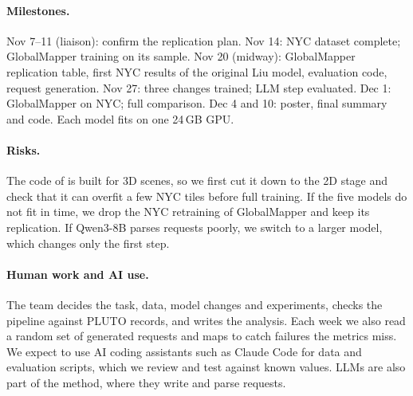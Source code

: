 \documentclass[twocolumn,11pt]{article}
\begin{document}
\paragraph{Milestones.} Nov 7--11 (liaison): confirm the replication plan. Nov 14: NYC dataset complete; GlobalMapper training on its sample. Nov 20 (midway): GlobalMapper replication table, first NYC results of the original Liu model, evaluation code, request generation. Nov 27: three changes trained; LLM step evaluated. Dec 1: GlobalMapper on NYC; full comparison. Dec 4 and 10: poster, final summary and code. Each model fits on one 24\,GB GPU.

\paragraph{Risks.} The code of \citet{liu2025controllable} is built for 3D scenes, so we first cut it down to the 2D stage and check that it can overfit a few NYC tiles before full training. If the five models do not fit in time, we drop the NYC retraining of GlobalMapper and keep its replication. If Qwen3-8B parses requests poorly, we switch to a larger model, which changes only the first step.

\paragraph{Human work and AI use.} The team decides the task, data, model changes and experiments, checks the pipeline against PLUTO records, and writes the analysis. Each week we also read a random set of generated requests and maps to catch failures the metrics miss. We expect to use AI coding assistants such as Claude Code for data and evaluation scripts, which we review and test against known values. LLMs are also part of the method, where they write and parse requests.




\end{document}
